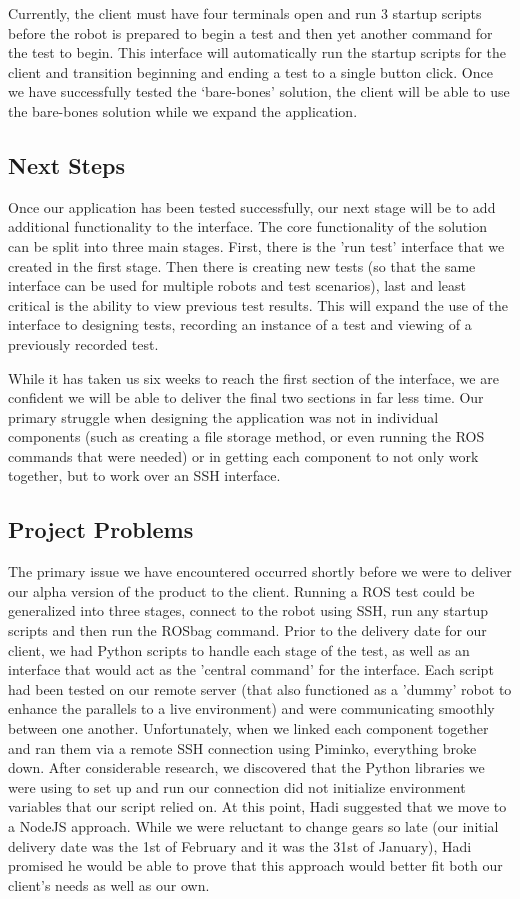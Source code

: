 \documentclass[onecolumn, draftclsnofoot,10pt, compsoc]{IEEEtran}
\begin{document}
Currently, the client must have four terminals open and run 3 startup scripts before the robot is prepared to begin a test and then yet another command for the test to begin. This interface will automatically run the startup scripts for the client and transition beginning and ending a test to a single button click. Once we have successfully tested the ‘bare-bones’ solution, the client will be able to use the bare-bones solution while we expand the application. 

\subsection{Next Steps}
Once our application has been tested successfully, our next stage will be to add additional functionality to the interface. The core functionality of the solution can be split into three main stages. First, there is the 'run test' interface that we created in the first stage. Then there is creating new tests (so that the same interface can be used for multiple robots and test scenarios), last and least critical is the ability to view previous test results. This will expand the use of the interface to designing tests, recording an instance of a test and viewing of a previously recorded test.

While it has taken us six weeks to reach the first section of the interface, we are confident we will be able to deliver the final two sections in far less time. Our primary struggle when designing the application was not in individual components (such as creating a file storage method, or even running the ROS commands that were needed) or in getting each component to not only work together, but to work over an SSH interface. 

\subsection{Project Problems}
The primary issue we have encountered occurred shortly before we were to deliver our alpha version of the product to the client. Running a ROS test could be generalized into three stages, connect to the robot using SSH, run any startup scripts and then run the ROSbag command. Prior to the delivery date for our client, we had Python scripts to handle each stage of the test, as well as an interface that would act as the 'central command' for the interface. Each script had been tested on our remote server (that also functioned as a 'dummy' robot to enhance the parallels to a live environment) and were communicating smoothly between one another. Unfortunately, when we linked each component together and ran them via a remote SSH connection using Piminko, everything broke down. After considerable research, we discovered that the Python libraries we were using to set up and run our connection did not initialize environment variables that our script relied on. At this point, Hadi suggested that we move to a NodeJS approach. While we were reluctant to change gears so late (our initial delivery date was the 1st of February and it was the 31st of January), Hadi promised he would be able to prove that this approach would better fit both our client's needs as well as our own. 
\end{document}
